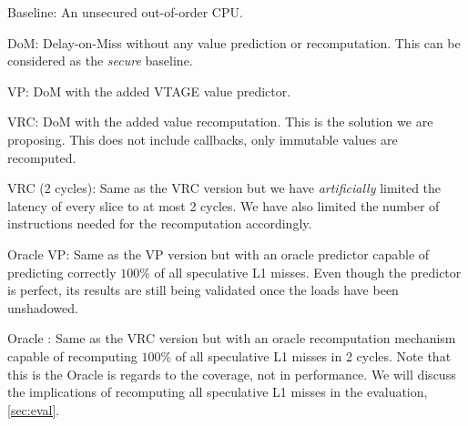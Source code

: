 \begin{LaTeXdescription}

    \item[Baseline:] An unsecured out-of-order CPU.

    \item[DoM:] Delay-on-Miss without any value prediction or recomputation. This can be considered as the \emph{secure} baseline.
    
    \item[VP:] DoM with the added VTAGE value predictor. 
    
    \item[VRC:] DoM with the added value recomputation. This is the solution we are proposing. This does not include callbacks, only immutable values are recomputed.
    
    \item[VRC (2 cycles):] Same as the VRC version but we have \emph{artificially} limited the latency of every slice to at most 2 cycles. We have also limited the number of instructions needed for the recomputation accordingly.
    
    \item[Oracle VP:] Same as the VP version but with an oracle predictor capable of predicting correctly $100\%$ of all speculative L1 misses. Even though the predictor is perfect, its results are still being validated once the loads have been unshadowed.
    
    \item[Oracle {\recomp}:] Same as the VRC version but with an oracle recomputation mechanism capable of recomputing $100\%$ of all speculative L1 misses in 2 cycles. Note that this is the Oracle is regards to the {\recomp} coverage, not in performance. We will discuss the implications of recomputing all speculative L1 misses in the evaluation, \autoref{sec:eval}.

\end{LaTeXdescription}

